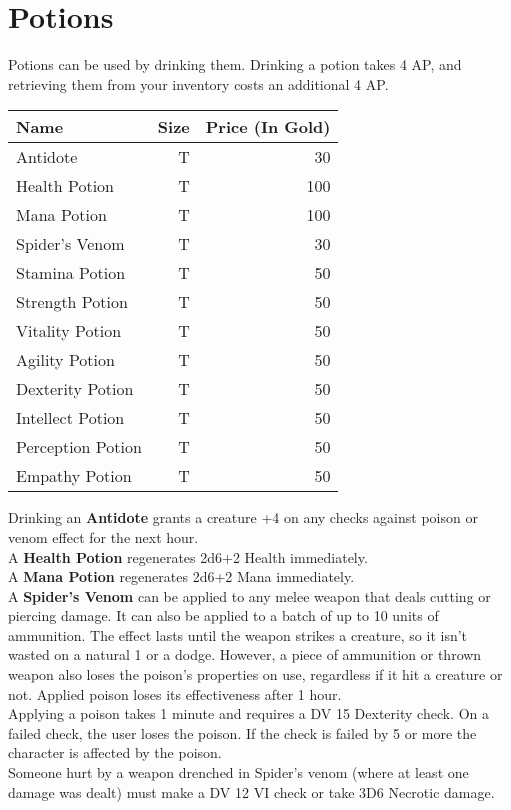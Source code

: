 \section{Potions}\label{sec:potions}
Potions can be used by drinking them.
Drinking a potion takes 4 AP, and retrieving them from your inventory costs an additional 4 AP.

\begin{longtable}{l | r | r}
	Name & Size & Price (In Gold)\\ \hline
	Antidote & T & 30\\
	Health Potion & T & 100\\
	Mana Potion & T & 100\\
	Spider's Venom & T & 30\\
	Stamina Potion & T & 50\\
	Strength Potion & T & 50\\
	Vitality Potion & T & 50\\
	Agility Potion & T & 50\\
	Dexterity Potion & T & 50\\
	Intellect Potion & T & 50\\
	Perception Potion & T & 50\\
	Empathy Potion & T & 50\\
\end{longtable}


Drinking an \textbf{Antidote} grants a creature +4 on any checks against poison or venom effect for the next hour.\\

A \textbf{Health Potion} regenerates 2d6+2 Health immediately.\\

A \textbf{Mana Potion} regenerates 2d6+2 Mana immediately.\\

A \textbf{Spider's Venom} can be applied to any melee weapon that deals cutting or piercing damage.
It can also be applied to a batch of up to 10 units of ammunition.
The effect lasts until the weapon strikes a creature, so it isn't wasted on a natural 1 or a dodge.
However, a piece of ammunition or thrown weapon also loses the poison's properties on use, regardless if it hit a creature or not.
Applied poison loses its effectiveness after 1 hour.\\
Applying a poison takes 1 minute and requires a DV 15 Dexterity check.
On a failed check, the user loses the poison.
If the check is failed by 5 or more the character is affected by the poison.\\
Someone hurt by a weapon drenched in Spider's venom (where at least one damage was dealt) must make a DV 12 VI check or take 3D6 Necrotic damage.\\

